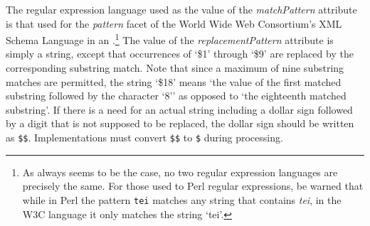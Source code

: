 The regular expression language used as the value of the {\itshape matchPattern} attribute is that used for the \textit{pattern} facet of the World Wide Web Consortium's XML Schema Language in an .\footnote{As always seems to be the case, no two regular expression languages are precisely the same. For those used to Perl regular expressions, be warned that while in Perl the pattern \texttt{tei} matches any string that contains \textit{tei}, in the W3C language it only matches the string ‘tei’.} The value of the {\itshape replacementPattern} attribute is simply a string, except that occurrences of ‘\$1’ through ‘\$9’ are replaced by the corresponding substring match. Note that since a maximum of nine substring matches are permitted, the string ‘\$18’ means ‘the value of the first matched substring followed by the character ‘8’’ as opposed to ‘the eighteenth matched substring’. If there is a need for an actual string including a dollar sign followed by a digit that is not supposed to be replaced, the dollar sign should be written as \texttt{\$\$}. Implementations must convert \texttt{\$\$} to \texttt{\$} during processing.
